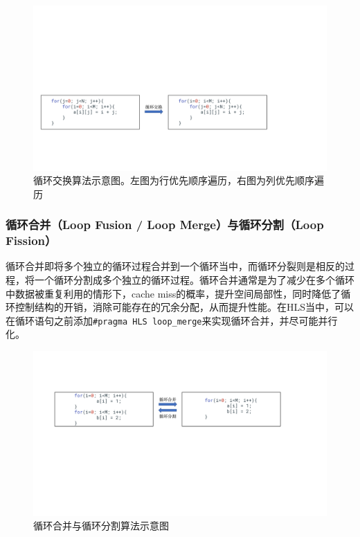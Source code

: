 \begin{figure}[htbp]
    \centering
    \includegraphics[width=\linewidth]{figures/loop interchange.pdf}
    \caption{循环交换算法示意图。左图为行优先顺序遍历，右图为列优先顺序遍历}
    \label{fig:loop_interchange}
\end{figure}

\subsubsection{循环合并（Loop Fusion / Loop Merge）与循环分割（Loop Fission）}

循环合并即将多个独立的循环过程合并到一个循环当中，而循环分裂则是相反的过程，将一个循环分割成多个独立的循环过程。循环合并通常是为了减少在多个循环中数据被重复利用的情形下，cache miss的概率，提升空间局部性，同时降低了循环控制结构的开销，消除可能存在的冗余分配，从而提升性能。在HLS当中，可以在循环语句之前添加\verb|#pragma HLS loop_merge|来实现循环合并，并尽可能并行化。

\begin{figure}[htbp]
    \centering
    \includegraphics[width=\linewidth]{figures/loop fusion.pdf}
    \caption{循环合并与循环分割算法示意图}
    \label{fig:loop_fusion}
\end{figure}


